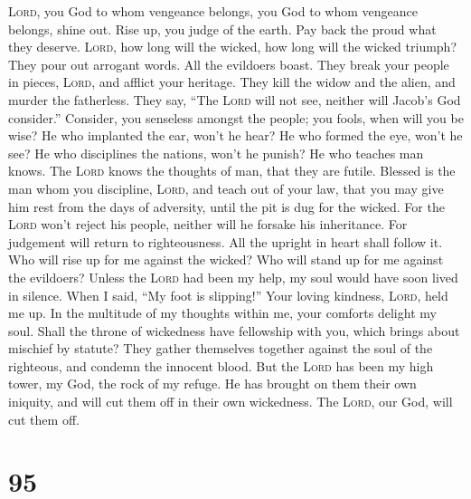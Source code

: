  \textsc{Lord}, you God to whom vengeance belongs, you God
to whom vengeance belongs, shine out.  Rise up, you judge
of the earth. Pay back the proud what they deserve. 
\textsc{Lord}, how long will the wicked, how long will the wicked
triumph?  They pour out arrogant words. All the evildoers
boast.  They break your people in pieces, \textsc{Lord},
and afflict your heritage.  They kill the widow and the
alien, and murder the fatherless.  They say, ``The
\textsc{Lord} will not see, neither will Jacob's God consider.''
 Consider, you senseless amongst the people; you fools,
when will you be wise?  He who implanted the ear, won't he
hear? He who formed the eye, won't he see?  He who
disciplines the nations, won't he punish? He who teaches man knows.
 The \textsc{Lord} knows the thoughts of man, that they
are futile.  Blessed is the man whom you discipline,
\textsc{Lord}, and teach out of your law,  that you may
give him rest from the days of adversity, until the pit is dug for the
wicked.  For the \textsc{Lord} won't reject his people,
neither will he forsake his inheritance.  For judgement
will return to righteousness. All the upright in heart shall follow it.
 Who will rise up for me against the wicked? Who will
stand up for me against the evildoers?  Unless the
\textsc{Lord} had been my help, my soul would have soon lived in
silence.  When I said, ``My foot is slipping!'' Your
loving kindness, \textsc{Lord}, held me up.  In the
multitude of my thoughts within me, your comforts delight my soul.
 Shall the throne of wickedness have fellowship with you,
which brings about mischief by statute?  They gather
themselves together against the soul of the righteous, and condemn the
innocent blood.  But the \textsc{Lord} has been my high
tower, my God, the rock of my refuge.  He has brought on
them their own iniquity, and will cut them off in their own wickedness.
The \textsc{Lord}, our God, will cut them off.

\hypertarget{section-94}{%
\section{95}\label{section-94}}

